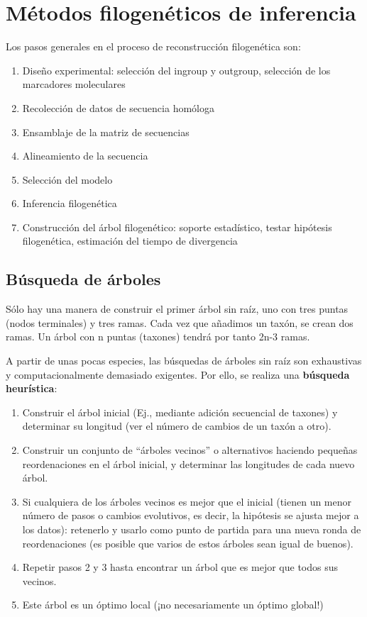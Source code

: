 \chapter{Métodos filogenéticos de inferencia}
Los pasos generales en el proceso de reconstrucción filogenética son: \begin{enumerate}
\item Diseño experimental: selección del ingroup y outgroup, selección de los marcadores moleculares
\item Recolección de datos de secuencia homóloga
\item Ensamblaje de la matriz de secuencias
\item Alineamiento de la secuencia
\item Selección del modelo
\item Inferencia filogenética
\item Construcción del árbol filogenético: soporte estadístico, testar hipótesis filogenética, estimación del tiempo de divergencia
\end{enumerate}

\section{Búsqueda de árboles}
Sólo hay una manera de construir el primer  árbol sin raíz, uno con tres puntas (nodos terminales) y tres ramas. Cada vez que añadimos un taxón, se crean dos ramas. Un árbol con n puntas (taxones) tendrá por tanto 2n-3 ramas.

A partir de unas pocas especies, las búsquedas de árboles sin raíz son exhaustivas y computacionalmente demasiado exigentes. Por ello, se realiza una \textbf{búsqueda heurística}: 
\begin{enumerate}
\item Construir el árbol inicial (Ej., mediante adición secuencial de taxones) y determinar su longitud (ver el número de cambios de un taxón a otro).
\item Construir un conjunto de “árboles vecinos” o alternativos haciendo pequeñas reordenaciones en el árbol inicial, y determinar las longitudes de cada nuevo árbol.
\item Si cualquiera de los árboles vecinos es mejor que el inicial (tienen un menor número de pasos o cambios evolutivos, es decir, la hipótesis se ajusta mejor a los datos): retenerlo y usarlo como punto de partida para una nueva ronda de reordenaciones (es posible que varios de estos árboles sean igual de buenos).
\item Repetir pasos 2 y 3 hasta encontrar un árbol que es mejor que todos sus vecinos.
\item Este árbol es un óptimo local (¡no necesariamente un óptimo global!)
\end{enumerate}

